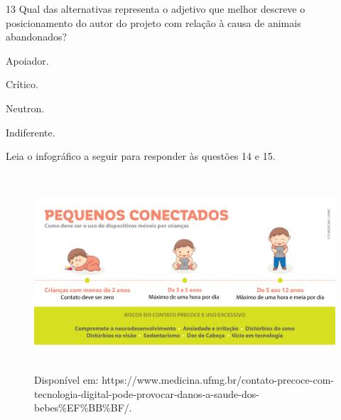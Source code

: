 \num{13} Qual das alternativas representa o adjetivo que melhor descreve
o posicionamento do autor do projeto com relação à causa de animais
abandonados?

\begin{escolha}
\item
  Apoiador.
\item
  Crítico.
\item
  Neutron.
\item
  Indiferente.
\end{escolha}



\noindent Leia o infográfico a seguir para responder às questões 14 e 15.

\begin{figure}[H]
\centering\includegraphics[width=5.90556in,height=2.88125in]{./imgSAEB_6_POR/media/image46.png}
\caption{Disponível em: https://www.medicina.ufmg.br/contato-precoce-com-tecnologia-digital-pode-provocar-danos-a-saude-dos-bebes\%EF\%BB\%BF/.}
\end{figure}



